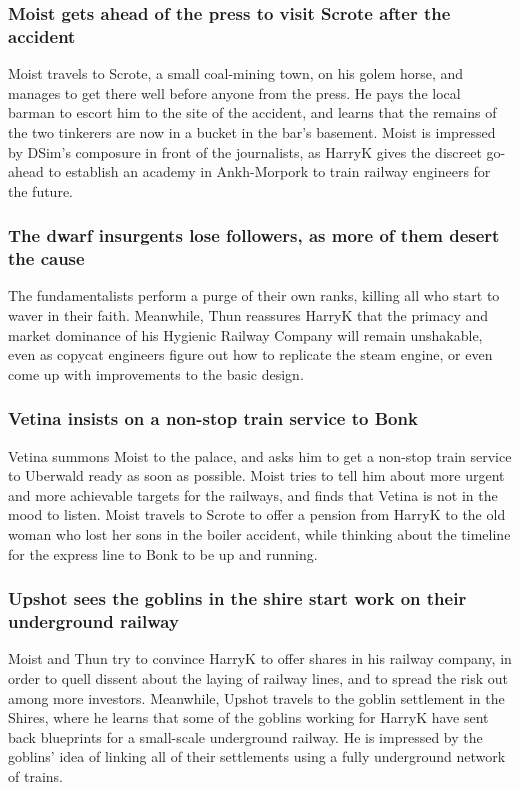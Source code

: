 \subsubsection{\Gls{Moist} gets ahead of the press to visit Scrote after the accident}
\Gls{Moist} travels to Scrote, a small coal-mining town, on his golem horse, and manages to get
there well before anyone from the press. He pays the local barman to escort him to the site of the
accident, and learns that the remains of the two tinkerers are now in a bucket in the bar's
basement. \Gls{Moist} is impressed by \Gls{DSim}'s composure in front of the journalists, as
\Gls{HarryK} gives the discreet go-ahead to establish an academy in Ankh-Morpork to train railway
engineers for the future.

\subsubsection{The dwarf insurgents lose followers, as more of them desert the cause}
The fundamentalists perform a purge of their own ranks, killing all who start to waver in their
faith. Meanwhile, \Gls{Thun} reassures \Gls{HarryK} that the primacy and market dominance of his
Hygienic Railway Company will remain unshakable, even as copycat engineers figure out how to
replicate the steam engine, or even come up with improvements to the basic design.

\subsubsection{\Gls{Vetina} insists on a non-stop train service to Bonk}
\Gls{Vetina} summons \Gls{Moist} to the palace, and asks him to get a non-stop train service to
Uberwald ready as soon as possible. \Gls{Moist} tries to tell him about more urgent and more
achievable targets for the railways, and finds that \Gls{Vetina} is not in the mood to listen.
\Gls{Moist} travels to Scrote to offer a pension from \Gls{HarryK} to the old woman who lost her
sons in the boiler accident, while thinking about the timeline for the express line to Bonk to be
up and running.

\subsubsection{\Gls{Upshot} sees the goblins in the shire start work on their underground railway}
\Gls{Moist} and \Gls{Thun} try to convince \Gls{HarryK} to offer shares in his railway company, in
order to quell dissent about the laying of railway lines, and to spread the risk out among more
investors. Meanwhile, \Gls{Upshot} travels to the goblin settlement in the Shires, where he learns
that some of the goblins working for \Gls{HarryK} have sent back blueprints for a small-scale
underground railway. He is impressed by the goblins' idea of linking all of their settlements using
a fully underground network of trains.

